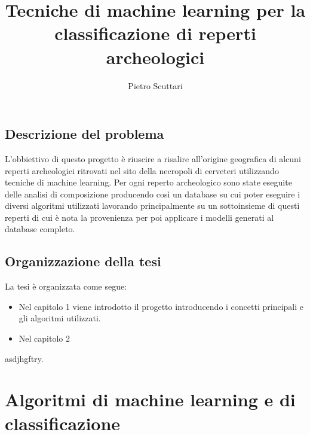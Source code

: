 \documentclass[a4paper,12pt]{report}
\begin{document}
\title{Tecniche di machine learning per la classificazione di reperti archeologici}
\author{Pietro Scuttari}
%
% 
%
\beforepreface
% 
%
\section{Descrizione del problema}
L'obbiettivo di questo progetto è riuscire a risalire all'origine geografica di
alcuni reperti archeologici ritrovati nel sito della necropoli di cerveteri
utilizzando tecniche di machine learning. Per ogni reperto archeologico sono
state eseguite delle analisi di composizione producendo così un database su cui
poter eseguire i diversi algoritmi utilizzati lavorando principalmente su un
sottoinsieme di questi reperti di cui è nota la provenienza per poi applicare i
modelli generati al database completo.


%
%
\section{Organizzazione della tesi}
\label{organizzazione}
La tesi \`e organizzata come segue:
\begin{itemize}
	\item Nel capitolo 1 viene introdotto il progetto introducendo i concetti
	principali e gli algoritmi utilizzati.

	\item Nel capitolo 2 

\end{itemize}
%
%
asdjhgftry.
\afterpreface
% 
% 
\chapter{Algoritmi di machine learning e di classificazione}
\label{cap1}
\end{document}
